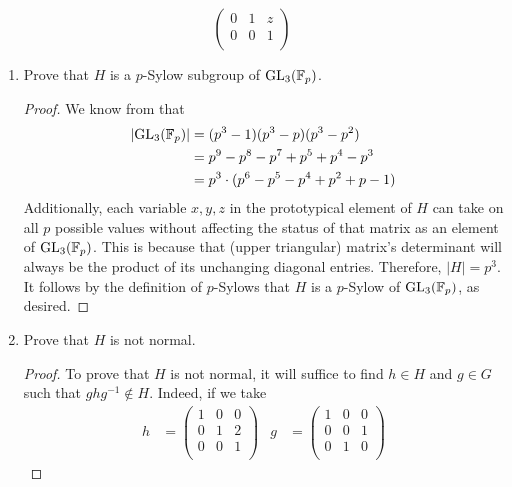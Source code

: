 \documentclass[../psets.tex]{subfiles}
\begin{document}
\begin{enumerate}
\begin{equation*}
\begin{pmatrix}
            0 & 1 & z\\
            0 & 0 & 1\\
        \end{pmatrix}
    \end{equation*}
    \begin{enumerate}
        \item Prove that $H$ is a $p$-Sylow subgroup of $\text{GL}_3(\mathbb{F}_p)$.
        \begin{proof}
            We know from \textcite[35]{bib:DummitFoote} that
            \begin{align*}
                |\text{GL}_3(\mathbb{F}_p)| &= (p^3-1)(p^3-p)(p^3-p^2)\\
                &= p^9-p^8-p^7+p^5+p^4-p^3\\
                &= p^3\cdot(p^6-p^5-p^4+p^2+p-1)
            \end{align*}
            Additionally, each variable $x,y,z$ in the prototypical element of $H$ can take on all $p$ possible values without affecting the status of that matrix as an element of $\text{GL}_3(\mathbb{F}_p)$. This is because that (upper triangular) matrix's determinant will always be the product of its unchanging diagonal entries. Therefore, $|H|=p^3$. It follows by the definition of $p$-Sylows that $H$ is a $p$-Sylow of $\text{GL}_3(\mathbb{F}_p)$, as desired.
        \end{proof}
        \item Prove that $H$ is not normal.
        \begin{proof}
            To prove that $H$ is not normal, it will suffice to find $h\in H$ and $g\in G$ such that $ghg^{-1}\notin H$. Indeed, if we take
            \begin{align*}
                h &=
                \begin{pmatrix}
                    1 & 0 & 0\\
                    0 & 1 & 2\\
                    0 & 0 & 1\\
                \end{pmatrix}&
                g &=
                \begin{pmatrix}
                    1 & 0 & 0\\
                    0 & 0 & 1\\
                    0 & 1 & 0\\
                \end{pmatrix}
            \end{align*}

\end{proof}
\end{enumerate}
\end{enumerate}
\end{document}
